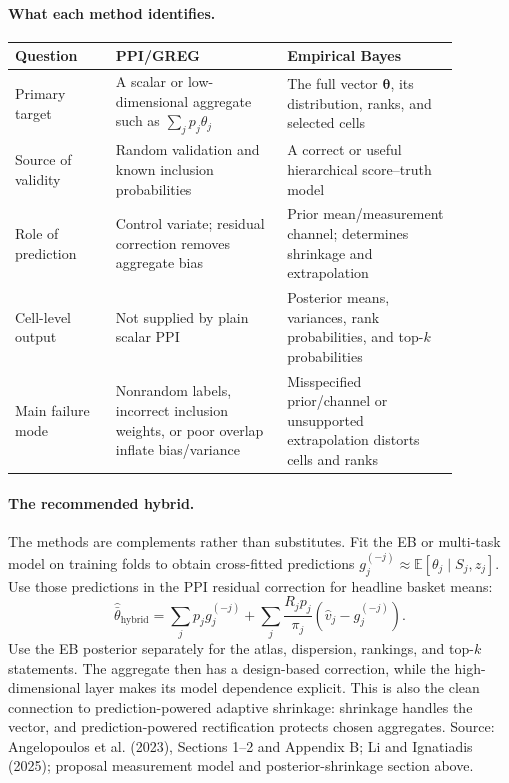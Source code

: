\documentclass[11pt]{article}
\newcommand{\E}{\mathbb{E}}
\newcommand{\thetav}{\boldsymbol{\theta}}
\begin{document}
\paragraph{What each method identifies.}
\begin{center}
\begin{tabular}{>{\raggedright\arraybackslash}p{0.20\linewidth}
                >{\raggedright\arraybackslash}p{0.34\linewidth}
                >{\raggedright\arraybackslash}p{0.34\linewidth}}
\toprule
Question & PPI/GREG & Empirical Bayes \\
\midrule
Primary target & A scalar or low-dimensional aggregate such as
\(\sum_jp_j\theta_j\) & The full vector \(\thetav\), its distribution, ranks,
and selected cells \\
Source of validity & Random validation and known inclusion probabilities & A
correct or useful hierarchical score--truth model \\
Role of prediction & Control variate; residual correction removes aggregate
bias & Prior mean/measurement channel; determines shrinkage and extrapolation \\
Cell-level output & Not supplied by plain scalar PPI & Posterior means,
variances, rank probabilities, and top-\(k\) probabilities \\
Main failure mode & Nonrandom labels, incorrect inclusion weights, or poor
overlap inflate bias/variance & Misspecified prior/channel or unsupported
extrapolation distorts cells and ranks \\
\bottomrule
\end{tabular}
\end{center}

\paragraph{The recommended hybrid.}
The methods are complements rather than substitutes.  Fit the EB or multi-task
model on training folds to obtain cross-fitted predictions
\(g_j^{(-j)}\approx\E[\theta_j\mid S_j,z_j]\).  Use those predictions in the
PPI residual correction for headline basket means:
\[
\widehat{\bar\theta}_{\mathrm{hybrid}}
=
\sum_jp_jg_j^{(-j)}
+\sum_j\frac{R_jp_j}{\pi_j}
(\widehat v_j-g_j^{(-j)}).
\]
Use the EB posterior separately for the atlas, dispersion, rankings, and
top-\(k\) statements.  The aggregate then has a design-based correction, while
the high-dimensional layer makes its model dependence explicit.  This is also
the clean connection to prediction-powered adaptive shrinkage: shrinkage
handles the vector, and prediction-powered rectification protects chosen
aggregates.  Source: Angelopoulos et al. (2023), Sections 1--2 and Appendix B;
Li and Ignatiadis (2025); proposal measurement model and posterior-shrinkage
section above.
\end{document}
